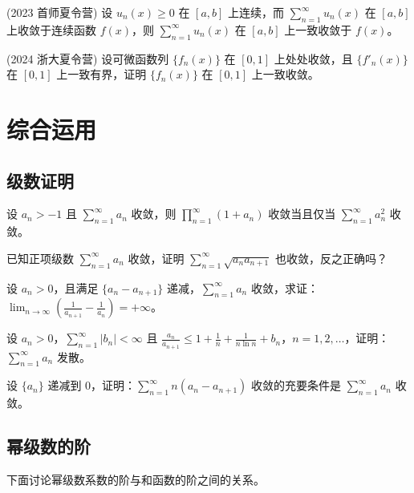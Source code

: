 \documentclass[lang=cn,10pt,thmcnt=section]{elegantbook}
\begin{document}
\begin{example}
(2023 首师夏令营) 设 $u_n(x) \geq 0$ 在 $[a,b]$ 上连续，而 $\sum_{n=1}^{\infty} u_n(x)$ 在 $[a,b]$ 上收敛于连续函数 $f(x)$，则 $\sum_{n=1}^{\infty} u_n(x)$ 在 $[a,b]$ 上一致收敛于 $f(x)$。
\end{example}

\begin{example}
(2024 浙大夏令营) 设可微函数列 $\{f_n(x)\}$ 在 $[0,1]$ 上处处收敛，且 $\{f'_n(x)\}$ 在 $[0,1]$ 上一致有界，证明 $\{f_n(x)\}$ 在 $[0,1]$ 上一致收敛。
\end{example}
\section{综合运用}
\subsection{级数证明}
\begin{example}
	设 $a_n > -1$ 且 $\sum_{n=1}^{\infty} a_n$ 收敛，则 $\prod_{n=1}^{\infty} (1 + a_n)$ 收敛当且仅当 $\sum_{n=1}^{\infty} a_n^2$ 收敛。
	\end{example}
	
	\begin{example}
	已知正项级数 $\sum_{n=1}^{\infty} a_n$ 收敛，证明 $\sum_{n=1}^{\infty} \sqrt{a_n a_{n+1}}$ 也收敛，反之正确吗？
	\end{example}
	
	\begin{example}
	设 $a_n > 0$，且满足 $\{a_n - a_{n+1}\}$ 递减，$\sum_{n=1}^{\infty} a_n$ 收敛，求证：$\lim_{n \to \infty} \left( \frac{1}{a_{n+1}} - \frac{1}{a_n} \right) = +\infty$。
	\end{example}
	
	\begin{example}
	设 $a_n > 0$，$\sum_{n=1}^{\infty} |b_n| < \infty$ 且 $\frac{a_n}{a_{n+1}} \leq 1 + \frac{1}{n} + \frac{1}{n \ln n} + b_n$，$n = 1, 2, \ldots$，证明：$\sum_{n=1}^{\infty} a_n$ 发散。
	\end{example}
	
	\begin{example}
	设 $\{a_n\}$ 递减到 0，证明：$\sum_{n=1}^{\infty} n(a_n - a_{n+1})$ 收敛的充要条件是 $\sum_{n=1}^{\infty} a_n$ 收敛。
	\end{example}
\subsection{幂级数的阶}
下面讨论幂级数系数的阶与和函数的阶之间的关系。
\end{document}
